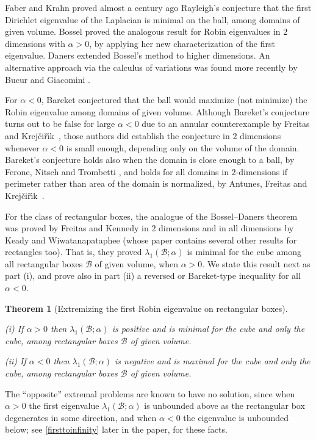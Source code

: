 \documentclass[12pt,reqno]{amsart}
\newtheorem{theorem}{Theorem}[section]
\theoremstyle{definition}
\newcommand{\Krejcirik}{{Krej\v{c}i\v{r}\'{\i}k}}
\begin{document}
Faber and Krahn proved almost a century ago Rayleigh's conjecture that the first Dirichlet eigenvalue of the Laplacian is minimal on the ball, among domains of given volume. Bossel \cite{B86} proved the analogous result for Robin eigenvalues in $2$ dimensions with $\alpha>0$, by applying her new characterization of the first eigenvalue. Daners \cite{D06} extended Bossel's method to higher dimensions. An alternative approach via the calculus of variations was found more recently by Bucur and Giacomini \cite{BG10,BG15a}. 

For $\alpha < 0$, Bareket \cite{B77} conjectured that the ball would maximize (not minimize) the Robin eigenvalue among domains of given volume. Although Bareket's conjecture turns out to be false for large $\alpha<0$ due to an annular counterexample by Freitas and \Krejcirik\ \cite{FK15}, those authors did establish the conjecture in $2$ dimensions whenever $\alpha<0$ is small enough, depending only on the volume of the domain. Bareket's conjecture holds also when the domain is close enough to a ball, by Ferone, Nitsch and Trombetti \cite{FNT15}, and holds for all domains in $2$-dimensions if perimeter rather than area of the domain is normalized, by Antunes, Freitas and \Krejcirik\ \cite[Theorem 2]{AFK17}.  

For the class of rectangular boxes, the analogue of the Bossel--Daners theorem was proved by Freitas and Kennedy \cite[Theorem 4.1]{FK18} in $2$ dimensions and in all dimensions by Keady and Wiwatanapataphee \cite{KW18} (whose paper contains several other results for rectangles too). That is, they proved $\lambda_1(\mathcal{B};\alpha)$ is minimal for the cube among all rectangular boxes $\mathcal{B}$ of given volume, when $\alpha>0$. We state this result next as part (i), and prove also in part (ii) a reversed or Bareket-type inequality for all $\alpha<0$. 

\begin{theorem}[Extremizing the first Robin eigenvalue on rectangular boxes]\label{lambda1higherdim}\ 

\noindent (i) If $\alpha>0$ then $\lambda_1(\mathcal{B};\alpha)$ is positive and is minimal for the cube and only the cube, among rectangular boxes $\mathcal{B}$ of given volume. 

\noindent (ii) If $\alpha<0$ then $\lambda_1(\mathcal{B};\alpha)$ is negative and is maximal for the cube and only the cube, among rectangular boxes $\mathcal{B}$ of given volume. 
\end{theorem}
%
The ``opposite'' extremal problems are known to have no solution, since when $\alpha>0$ the first eigenvalue $\lambda_1(\mathcal{B};\alpha)$ is unbounded above as the rectangular box degenerates in some  direction, and when $\alpha<0$ the eigenvalue is unbounded below; see \eqref{firsttoinfinity} later in the paper, for these facts. 
\end{document}

